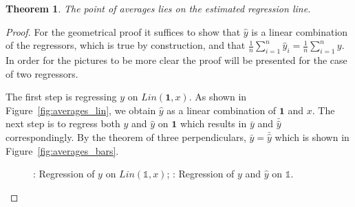 \documentclass[nobib]{tufte-handout}
\newtheorem{theorem}{Theorem}
\begin{document}
\begin{theorem}
The point of averages lies on the estimated regression line.
\end{theorem}

\begin{proof}
For the geometrical proof it suffices to show that $\hat y$ is a linear combination of the regressors, which is true by construction,
and that $\frac{1}{n} \sum_{i=1}^{n} \hat y_i = \frac{1}{n} \sum_{i=1}^{n} y$. In order for the pictures to be more clear the proof will be presented for the case of two regressors.

The first step is regressing $y$ on $Lin(\mathbf{1}, x)$. As shown in Figure~\ref{fig:averages_lin}, we obtain $\hat y$ as a linear combination of $\mathbf{1}$ and $x$.
The next step is to regress both $y$ and $\hat y$ on $\mathbf{1}$ which results in $\bar y$ and $\bar \hat y$ correspondingly.
By the theorem of three perpendiculars, $\bar y = \bar \hat y$ which is shown in Figure~\ref{fig:averages_bars}.

\begin{figure}[ht!]
\begin{center}
\hspace{4ex}
\caption{: Regression of $y$ on $Lin(\mathbb{1},x)$; : Regression of $y$ and $\hat y$ on $\mathbb{1}$.}
\end{center}
\end{figure}


\end{proof}
\end{document}
